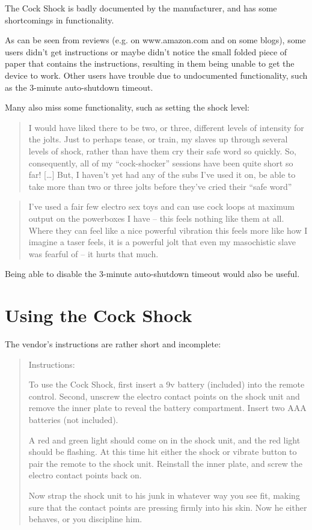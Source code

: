 \documentclass[a4paper]{article}
\begin{document}
The Cock Shock is badly documented by the manufacturer, and has some shortcomings in functionality.

As can be seen from reviews (e.g. on www.amazon.com and on some blogs), some users didn't get instructions or maybe didn't notice the small folded piece of paper that contains the instructions, resulting in them being unable to get the device to work. Other users have trouble due to undocumented functionality, such as the 3-minute auto-shutdown timeout.

Many also miss some functionality, such as setting the shock level:

\begin{quotation}
I would have liked there to be two, or three, different levels of intensity for the jolts. Just to perhaps tease, or train, my slaves up through several levels of shock, rather than have them cry their safe word so quickly. So, consequently, all of my “cock-shocker” sessions have been quite short so far! […] But, I haven’t yet had any of the subs I’ve used it on, be able to take more than two or three jolts before they’ve cried their “safe word”\cite{Ellison2016}
\end{quotation}

\begin{quotation}
I’ve used a fair few electro sex toys and can use cock loops at maximum output on the powerboxes I have – this feels nothing like them at all. Where they can feel like a nice powerful vibration this feels more like how I imagine a taser feels, it is a powerful jolt that even my masochistic slave was fearful of – it hurts that much.\cite{Decerous2016}
\end{quotation}

Being able to disable the 3-minute auto-shutdown timeout would also be useful.

\section{Using the Cock Shock}

The vendor's instructions are rather short and incomplete:

\begin{quotation}
Instructions:

To use the Cock Shock, first insert a 9v battery (included) into the remote control. Second, unscrew the electro contact points on the shock unit and remove the inner plate to reveal the battery compartment. Insert two AAA batteries (not included).

A red and green light should come on in the shock unit, and the red light should be flashing. At this time hit either the shock or vibrate button to pair the remote to the shock unit. Reinstall the inner plate, and screw the electro contact points back on.

Now strap the shock unit to his junk in whatever way you see fit, making sure that the contact points are pressing firmly into his skin. Now he either behaves, or you discipline him.\cite{MasterSeriesCockShockInstructions}
\end{quotation}
\end{document}
